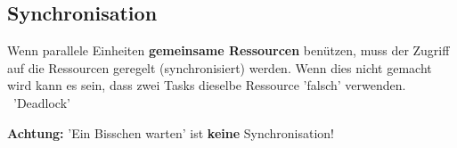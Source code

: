 \subsection{Synchronisation}

Wenn parallele Einheiten \textbf{gemeinsame Ressourcen} benützen, muss der Zugriff auf die Ressourcen geregelt (synchronisiert) werden.
Wenn dies nicht gemacht wird kann es sein, dass zwei Tasks dieselbe Ressource 'falsch' verwenden. \textrightarrow\ 'Deadlock'

\vspace{0.1cm}

\textbf{Achtung: } 'Ein Bisschen warten' ist \textbf{keine} Synchronisation!

\columnbreak

